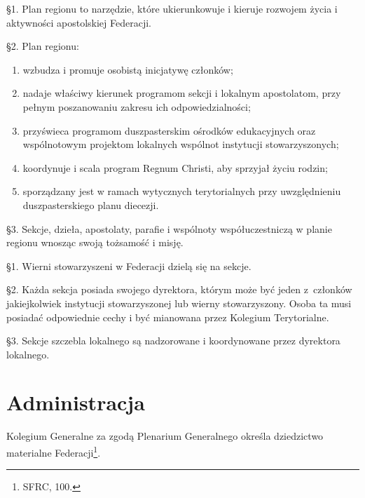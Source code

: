 
 \S{}1. Plan regionu to narzędzie, które ukierunkowuje i kieruje rozwojem życia i aktywności apostolskiej Federacji.

\S{}2. Plan regionu:
\begin{enumerate}
	
	\item wzbudza i promuje osobistą inicjatywę członków;
	
	\item nadaje właściwy kierunek programom sekcji i lokalnym apostolatom, przy pełnym poszanowaniu zakresu ich odpowiedzialności;
	
	\item przyświeca programom duszpasterskim ośrodków edukacyjnych oraz wspólnotowym projektom lokalnych wspólnot instytucji stowarzyszonych;
	
	\item koordynuje i scala program Regnum Christi, aby sprzyjał życiu rodzin;
	
	\item sporządzany jest w ramach wytycznych terytorialnych przy uwzględnieniu duszpasterskiego planu diecezji.
\end{enumerate}

\S{}3. Sekcje, dzieła, apostolaty, parafie i wspólnoty współuczestniczą w planie regionu wnosząc swoją tożsamość i misję.


 \S{}1. Wierni stowarzyszeni w Federacji dzielą się na sekcje.

\S{}2. Każda sekcja posiada swojego dyrektora, którym może być jeden \mbox{z członków} jakiejkolwiek instytucji stowarzyszonej lub wierny stowarzyszony. Osoba ta musi posiadać odpowiednie cechy i być mianowana przez Kolegium Terytorialne.

\S{}3. Sekcje szczebla lokalnego są nadzorowane i koordynowane przez dyrektora lokalnego.

\chapter{Administracja}


 Kolegium Generalne za zgodą Plenarium Generalnego określa dziedzictwo materialne Federacji\footnote{SFRC, 100.}.


